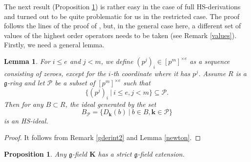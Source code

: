 \documentclass[10pt]{amsart}
\newtheorem{prop}[theorem]{Proposition}
\newtheorem{lemma}[theorem]{Lemma}
\theoremstyle{definition}
\newtheorem{remark}[theorem]{Remark}
\begin{document}
\noindent
The next result (Proposition \ref{gstrictexist}) is rather easy in the case of full HS-derivations and turned out to be quite problematic for us in the restricted case. The proof follows the lines of the proof of \cite[Fact 2.5]{K3}, but, in the general case here, a different set of values of the highest order operators needs to be taken (see Remark \ref{values}). Firstly, we need a general lemma.
\begin{lemma}\label{hsideal}
For $i\leqslant e$ and $j<m$, we define $(p^j)_i\in [p^m]^{\times e}$ as a sequence consisting of zeroes, except for the $i$-th coordinate where it has $p^j$. Assume $R$ is a $\mathfrak{g}$-ring and let $\mathcal{P}$ be a subset of $[p^m]^{\times e}$ such that
$$\{(p^j)_i\ |\ i\leqslant e,j<m\}\subseteq \mathcal{P}.$$
Then for any $B\subset R$, the ideal generated by the set
$$B_{\mathcal{P}}=\{D_{\mathbf{k}}(b)\ |\ b\in B,\mathbf{k}\in \mathcal{P}\}$$
is an HS-ideal.
\end{lemma}
\begin{proof}
It follows from Remark \ref{gderint2} and Lemma \ref{newton}.
\end{proof}
\begin{prop}\label{gstrictexist}
Any $\mathfrak{g}$-field $\mathbf{K}$ has a strict $\mathfrak{g}$-field extension.
\end{prop}
\end{document}

